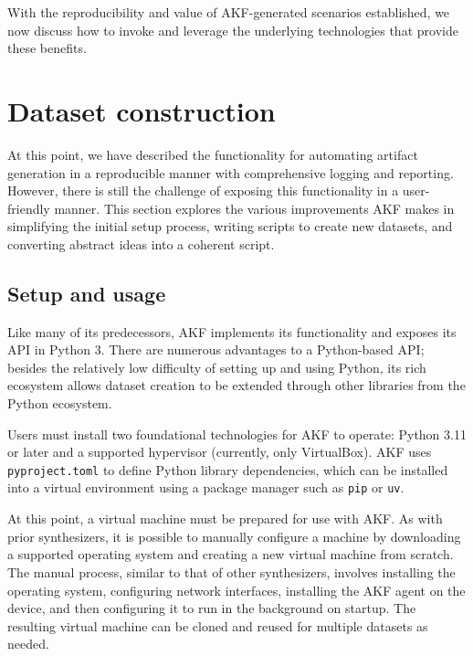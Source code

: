 \documentclass[preprint,12pt]{elsarticle}
\newcommand{\passthrough}[1]{#1}
\begin{document}
With the reproducibility and value of AKF-generated scenarios
established, we now discuss how to invoke and leverage the underlying
technologies that provide these benefits.

\section{Dataset construction}\label{dataset-construction}

At this point, we have described the functionality for automating
artifact generation in a reproducible manner with comprehensive logging
and reporting. However, there is still the challenge of exposing this
functionality in a user-friendly manner. This section explores the
various improvements AKF makes in simplifying the initial setup process,
writing scripts to create new datasets, and converting abstract ideas
into a coherent script.

\subsection{Setup and usage}\label{setup-and-usage}

Like many of its predecessors, AKF implements its functionality and
exposes its API in Python 3. There are numerous advantages to a
Python-based API; besides the relatively low difficulty of setting up
and using Python, its rich ecosystem allows dataset creation to be
extended through other libraries from the Python ecosystem.

Users must install two foundational technologies for AKF to operate:
Python 3.11 or later and a supported hypervisor (currently, only
VirtualBox). AKF uses \passthrough{\lstinline!pyproject.toml!} to define
Python library dependencies, which can be installed into a virtual
environment using a package manager such as
\passthrough{\lstinline!pip!} or \passthrough{\lstinline!uv!}.

At this point, a virtual machine must be prepared for use with AKF. As
with prior synthesizers, it is possible to manually configure a machine
by downloading a supported operating system and creating a new virtual
machine from scratch. The manual process, similar to that of other
synthesizers, involves installing the operating system, configuring
network interfaces, installing the AKF agent on the device, and then
configuring it to run in the background on startup. The resulting
virtual machine can be cloned and reused for multiple datasets as
needed.
\end{document}
